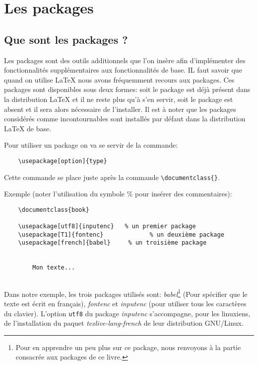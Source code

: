 
\chapter{Les packages}
\section{Que sont les packages ?}
Les packages sont des outils additionnels que l'on insère afin d'implémenter des fonctionnalités supplémentaires aux fonctionnalités de base. IL faut savoir que quand on utilise \LaTeX{} nous avons fréquemment recours aux packages. Ces packages sont disponibles sous deux formes: soit le package est déjà présent dans la distribution \LaTeX{} et il ne reste plus qu'à s'en servir, soit le package est absent et il sera alors nécessaire de l'installer. Il est à noter que les packages considérés comme incontournables sont installés par défaut dans la distribution \LaTeX{} de base.
\medskip

Pour utiliser un package on va se servir de la commande:
\begin{verbatim}
	\usepackage[option]{type}
\end{verbatim}  
\medskip

Cette commande se place juste après la commande \verb|\documentclass{}|.
\medskip

Exemple (noter l'utilisation du symbole \% pour insérer des commentaires):
\begin{verbatim}
	\documentclass{book}
	
	\usepackage[utf8]{inputenc}	  % un premier package
	\usepackage[T1]{fontenc}		     % un deuxième package
	\usepackage[french]{babel}	   % un troisième package
	
	
	    Mon texte...
	
\end{verbatim}
\medskip

Dans notre exemple, les trois packages utilisés sont: \textit{babel}\footnote{Pour en apprendre un peu plus sur ce package, nous renvoyons à la partie consacrée aux packages de ce livre.} (Pour spécifier que le texte est écrit en français), \textit{fontenc} et \textit{inputenc} (pour utiliser tous les caractères du clavier). L'option \texttt{utf8} du package \textit{inputenc} s'accompagne, pour les linuxiens, de l'installation du paquet \textit{texlive-lang-french} de leur distribution GNU/Linux.
\medskip

